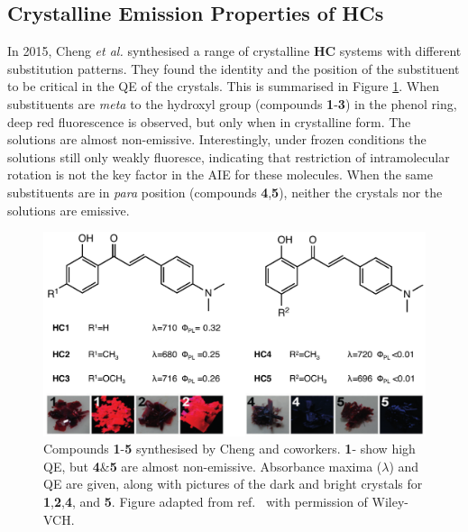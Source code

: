 \subsection{Crystalline Emission Properties of \acp{HC}}
In 2015, Cheng \textit{et al.} synthesised a range of crystalline \textbf{HC} systems with different substitution patterns.\cite{Cheng2015} They found the identity and the position of the substituent to be critical in the \ac{QE} of the crystals. This is summarised in Figure \ref{figure: HC_experimental}. When substituents are \textit{meta} to  the hydroxyl group (compounds \textbf{1}-\textbf{3}) in the phenol ring, deep red fluorescence is observed, but only when in crystalline form. The solutions are almost non-emissive. Interestingly, under frozen conditions the solutions still only weakly fluoresce, indicating that restriction of intramolecular rotation is not the key factor in the \ac{AIE} for these molecules. When the same substituents are in \textit{para} position (compounds \textbf{4},\textbf{5}), neither the crystals nor the solutions are emissive. 
\begin{figure}[H]
\centering
  \includegraphics[width=0.95\linewidth]{1Intro/HC_experimental.pdf}
  \caption[Emission behaviour of crystalline 2'-hydroxychalcone derivatives]{Compounds \textbf{1}-\textbf{5} synthesised by Cheng and coworkers. \textbf{1}-\textbf{} show high \ac{QE}, but \textbf{4}\&\textbf{5} are almost non-emissive. Absorbance maxima ($\lambda$) and \acf{QE} are given, along with pictures of the dark and bright crystals for \textbf{1},\textbf{2},\textbf{4}, and \textbf{5}. Figure adapted from ref.~ with permission of Wiley-VCH.}
  \label{figure: HC_experimental}
\end{figure}

